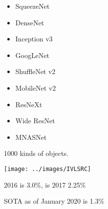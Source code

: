 {{\begin{itemize}
\item SqueezeNet

\item DenseNet

\item Inception v3

\item GoogLeNet

\item ShuffleNet v2

\item MobileNet v2

\item ResNeXt

\item Wide ResNet

\item MNASNet
\end{itemize}
}


1000 kinds of objects.

\vfill
\centerline{\texttt{[image: ../images/IVLSRC]}}
2016 is 3.0\%, is 2017 2.25\%

\medskip
SOTA as of January 2020 is 1.3\%




}

